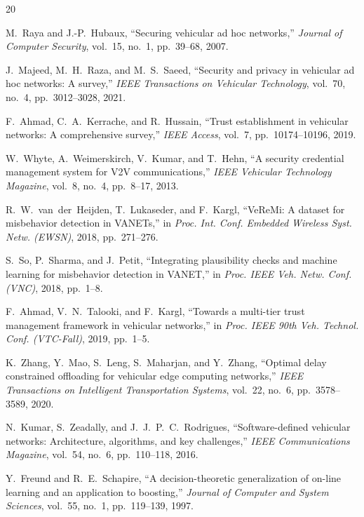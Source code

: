 \documentclass[conference]{IEEEtran}
\begin{document}
\begin{thebibliography}{20}

M.~Raya and J.-P.~Hubaux,
``Securing vehicular ad hoc networks,''
\textit{Journal of Computer Security}, vol.~15, no.~1, pp.~39--68, 2007.

J.~Majeed, M.~H.~Raza, and M.~S.~Saeed,
``Security and privacy in vehicular ad hoc networks: A survey,''
\textit{IEEE Transactions on Vehicular Technology}, vol.~70, no.~4, pp.~3012--3028, 2021.

F.~Ahmad, C.~A.~Kerrache, and R.~Hussain,
``Trust establishment in vehicular networks: A comprehensive survey,''
\textit{IEEE Access}, vol.~7, pp.~10174--10196, 2019.

W.~Whyte, A.~Weimerskirch, V.~Kumar, and T.~Hehn,
``A security credential management system for V2V communications,''
\textit{IEEE Vehicular Technology Magazine}, vol.~8, no.~4, pp.~8--17, 2013.

R.~W.~van~der~Heijden, T.~Lukaseder, and F.~Kargl,
``VeReMi: A dataset for misbehavior detection in VANETs,''
in \textit{Proc. Int. Conf. Embedded Wireless Syst. Netw. (EWSN)}, 2018, pp.~271--276.

S.~So, P.~Sharma, and J.~Petit,
``Integrating plausibility checks and machine learning for misbehavior detection in VANET,''
in \textit{Proc. IEEE Veh. Netw. Conf. (VNC)}, 2018, pp.~1--8.

F.~Ahmad, V.~N.~Talooki, and F.~Kargl,
``Towards a multi-tier trust management framework in vehicular networks,''
in \textit{Proc. IEEE 90th Veh. Technol. Conf. (VTC-Fall)}, 2019, pp.~1--5.

K.~Zhang, Y.~Mao, S.~Leng, S.~Maharjan, and Y.~Zhang,
``Optimal delay constrained offloading for vehicular edge computing networks,''
\textit{IEEE Transactions on Intelligent Transportation Systems}, vol.~22, no.~6, pp.~3578--3589, 2020.

N.~Kumar, S.~Zeadally, and J.~J.~P.~C.~Rodrigues,
``Software-defined vehicular networks: Architecture, algorithms, and key challenges,''
\textit{IEEE Communications Magazine}, vol.~54, no.~6, pp.~110--118, 2016.

Y.~Freund and R.~E.~Schapire,
``A decision-theoretic generalization of on-line learning and an application to boosting,''
\textit{Journal of Computer and System Sciences}, vol.~55, no.~1, pp.~119--139, 1997.


\end{thebibliography}
\end{document}
